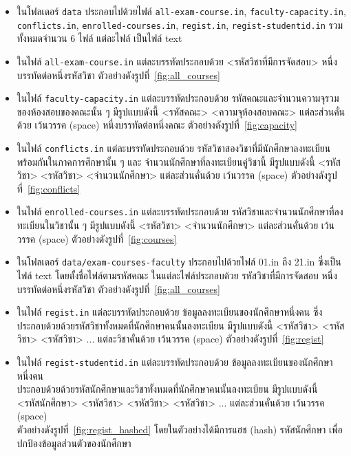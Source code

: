 \newcommand\str[1]{\texttt{#1}}
\begin{itemize}
  \item ในโฟลเดอร์ \str{data} ประกอบไปด้วยไฟล์ \str{all-exam-course.in}, \str{faculty-capacity.in},
  \\ \str{conflicts.in}, \str{enrolled-courses.in}, \str{regist.in}, \str{regist-studentid.in} รวมทั้งหมดจำนวน 6 ไฟล์ แต่ละไฟล์ เป็นไฟล์ text 
  \item ในไฟล์ \str{all-exam-course.in} แต่ละบรรทัดประกอบด้วย <รหัสวิชาที่มีการจัดสอบ> หนึ่งบรรทัดต่อหนึ่งรหัสวิชา ตัวอย่างดังรูปที่~\ref{fig:all_courses}
  \item ในไฟล์ \str{faculty-capacity.in} แต่ละบรรทัดประกอบด้วย รหัสคณะและจำนวนความจุรวมของห้องสอบของคณะนั้น ๆ มีรูปแบบดังนี้ <รหัสคณะ> <ความจุห้องสอบคณะ> แต่ละส่วนคั่นด้วย เว้นวรรค (space) หนึ่งบรรทัดต่อหนึ่งคณะ ตัวอย่างดังรูปที่~\ref{fig:capacity}
  \item ในไฟล์ \str{conflicts.in} แต่ละบรรทัดประกอบด้วย รหัสวิชาสองวิชาที่มีนักศึกษาลงทะเบียนพร้อมกันในภาคการศึกษานั้น ๆ และ จำนวนนักศึกษาที่ลงทะเบียนคู่วิชานี้ มีรูปแบบดังนี้ <รหัสวิชา> <รหัสวิชา> <จำนวนนักศึกษา> แต่ละส่วนคั่นด้วย เว้นวรรค (space) ตัวอย่างดังรูปที่~\ref{fig:conflicts}
  \item ในไฟล์ \str{enrolled-courses.in} แต่ละบรรทัดประกอบด้วย รหัสวิชาและจำนวนนักศึกษาที่ลงทะเบียนในวิชานั้น ๆ มีรูปแบบดังนี้ <รหัสวิชา> <จำนวนนักศึกษา> แต่ละส่วนคั่นด้วย เว้นวรรค (space) ตัวอย่างดังรูปที่~\ref{fig:courses}
  \item ในโฟลเดอร์ \str{data/exam-courses-faculty} ประกอบไปด้วยไฟล์ 01.in ถึง 21.in ซึ่งเป็นไฟล์ text โดยตั้งชื่อไฟล์ตามรหัสคณะ ในแต่ละไฟล์ประกอบด้วย รหัสวิชาที่มีการจัดสอบ หนึ่งบรรทัดต่อหนึ่งรหัสวิชา ตัวอย่างดังรูปที่~\ref{fig:all_courses} 
  \item ในไฟล์ \str{regist.in} แต่ละบรรทัดประกอบด้วย ข้อมูลลงทะเบียนของนักศึกษาหนึ่งคน ซึ่งประกอบด้วยด้วยรหัสวิชาทั้งหมดที่นักศึกษาคนนั้นลงทะเบียน มีรูปแบบดังนี้ <รหัสวิชา> <รหัสวิชา> <รหัสวิชา> ... แต่ละวิชาคั่นด้วย เว้นวรรค (space) ตัวอย่างดังรูปที่~\ref{fig:regist}
  \item ในไฟล์ \str{regist-studentid.in} แต่ละบรรทัดประกอบด้วย ข้อมูลลงทะเบียนของนักศึกษาหนึ่งคน \\ ประกอบด้วยด้วยรหัสนักศึกษาและวิชาทั้งหมดที่นักศึกษาคนนั้นลงทะเบียน มีรูปแบบดังนี้ \\ <รหัสนักศึกษา> <รหัสวิชา> <รหัสวิชา> <รหัสวิชา> ... แต่ละส่วนคั่นด้วย เว้นวรรค (space) \\ ตัวอย่างดังรูปที่~\ref{fig:regist_hashed}
  โดยในตัวอย่างได้มีการแฮช (hash) รหัสนักศึกษา เพื่อปกป้องข้อมูลส่วนตัวของนักศึกษา
\end{itemize}

